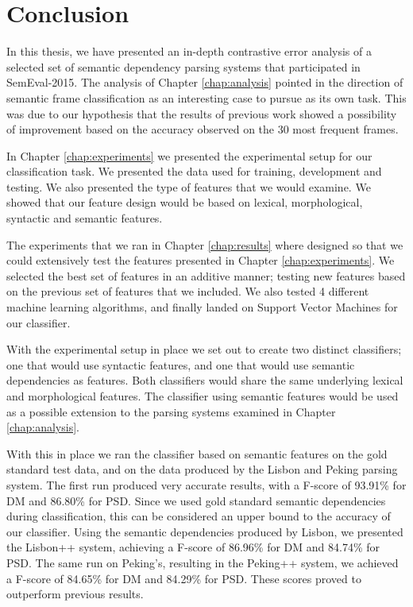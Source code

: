 \chapter{Conclusion}
\label{chap:conclusion}


In this thesis, we have presented an in-depth contrastive error analysis of a selected set of semantic dependency parsing systems that participated in SemEval-2015. The analysis of Chapter \ref{chap:analysis} pointed in the direction of semantic frame classification as an interesting case to pursue as its own task. This was due to our hypothesis that the results of previous work showed a possibility of improvement based on the accuracy observed on the 30 most frequent frames.

In Chapter \ref{chap:experiments} we presented the experimental setup for our classification task. We presented the data used for training, development and testing. We also presented the type of features that we would examine. We showed that our feature design would be based on lexical, morphological, syntactic and semantic features. 

The experiments that we ran in Chapter \ref{chap:results} where designed so that we could extensively test the features presented in Chapter \ref{chap:experiments}. We selected the best set of features in an additive manner; testing new features based on the previous set of features that we included. We also tested 4 different machine learning algorithms, and finally landed on Support Vector Machines for our classifier.

With the experimental setup in place we set out to create two distinct classifiers; one that would use syntactic features, and one that would use semantic dependencies as features. Both classifiers would share the same underlying lexical and morphological features. The classifier using semantic features would be used as a possible extension to the parsing systems examined in Chapter \ref{chap:analysis}.

With this in place we ran the classifier based on semantic features on the gold standard test data, and on the data produced by the Lisbon and Peking parsing system. The first run produced very accurate results, with a F-score of 93.91\% for DM and 86.80\% for PSD. Since we used gold standard semantic dependencies during classification, this can be considered an upper bound to the accuracy of our classifier. Using the semantic dependencies produced by Lisbon, we presented the Lisbon++ system, achieving a F-score of 86.96\% for DM and 84.74\% for PSD. The same run on Peking's, resulting in the Peking++ system, we achieved a F-score of 84.65\% for DM and 84.29\% for PSD. These scores proved to outperform previous results.

